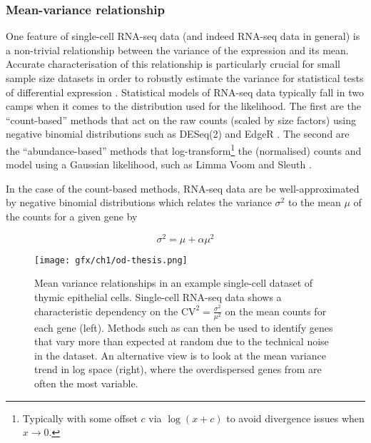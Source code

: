 \subsubsection{Mean-variance relationship}

One feature of single-cell RNA-seq data (and indeed RNA-seq data in general) is a non-trivial relationship between the variance of the expression and its mean. Accurate characterisation of this relationship is particularly crucial for small sample size datasets in order to robustly estimate the variance for statistical tests of differential expression \cite{Robinson2010-rj}. Statistical models of RNA-seq data typically fall in two camps when it comes to the distribution used for the likelihood. The first are the ``count-based'' methods  that act on the raw counts (scaled by size factors) using negative binomial distributions such as DESeq(2) and EdgeR \cite{Anders2010,Robinson2010-rj}. The second are the ``abundance-based'' methods  that log-transform\footnote{
Typically with some offset $c$ via $\log(x+c)$ to avoid divergence issues when $x \rightarrow 0$.
} the (normalised) counts and model using a Gaussian likelihood, such as Limma Voom and Sleuth \cite{Law2014-tu,Pimentel2016-xz}.

In the case of the count-based methods, RNA-seq data are  be well-approximated by negative binomial distributions \cite{Anders2010,Robinson2010-rj,Risso2017-qk} which relates the variance $\sigma^2$ to the mean $\mu$ of the counts for a given gene by

\begin{equation}
  \sigma^2 = \mu + \alpha \mu^2
\end{equation}

\begin{figure}
\centering
  \texttt{[image: gfx/ch1/od-thesis.png]}
  \caption[Mean-variance relationships in an example single-cell dataset.]{Mean variance relationships in an example single-cell dataset of thymic epithelial cells. Single-cell RNA-seq data shows a characteristic dependency on the $\text{CV}^2 = \frac{\sigma^2}
{\mu^2}$ on the mean counts for each gene (left). Methods such as \cite{Brennecke2013-xy} can then be used to identify genes that vary more than expected at random due to the technical noise in the dataset. An alternative view is to look at the mean variance trend in log space (right), where the overdispersed genes from \cite{Brennecke2013-xy} are often the most variable.} \label{fig:od}
\end{figure}


